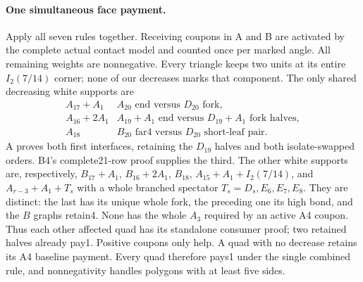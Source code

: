 \paragraph{One simultaneous face payment.}
Apply all seven rules together. Receiving coupons in A and B are
activated by the complete actual contact model and counted once per
marked angle. All remaining weights are nonnegative. Every triangle
keeps two units at its entire $I_2(7/14)$ corner; none of our decreases
marks that component. The only shared decreasing white supports are
\[
\begin{array}{c|l}
 A_{17}+A_1&A_{20}\text{ end versus }D_{20}\text{ fork},\\
 A_{16}+2A_1&A_{19}+A_1\text{ end versus }D_{19}+A_1\text{ fork halves},\\
 A_{18}&B_{20}\text{ far4 versus }D_{20}\text{ short-leaf pair}.
\end{array}
\]
A proves both first interfaces, retaining the $D_{19}$ halves and
both isolate-swapped orders. B4's complete21-row proof supplies the
third. The other white supports are, respectively,
$B_{17}+A_1$, $B_{16}+2A_1$, $B_{18}$,
$A_{15}+A_1+I_2(7/14)$, and $A_{r-3}+A_1+T_s$ with a whole
branched spectator $T_s=D_s,E_6,E_7,E_8$.
They are distinct: the last has its unique whole fork, the preceding
one its high bond, and the $B$ graphs retain4. None has the whole
$A_3$ required by an active A4 coupon. Thus each other affected quad
has its standalone consumer proof; two retained halves already pay1.
Positive coupons only help. A quad with no decrease retains its A4
baseline payment. Every quad therefore pays1 under the single combined
rule, and nonnegativity handles polygons with at least five sides.

